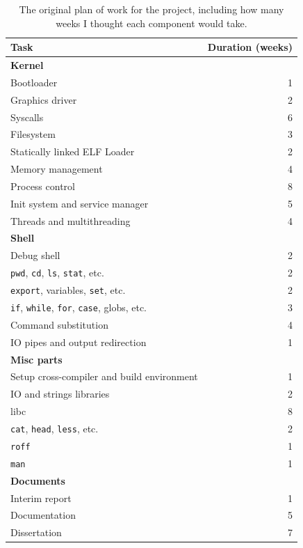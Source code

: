 \documentclass{article}
\begin{document}
\begin{table}[H]
\begin{center}
\begin{tabular}{|l|r|}
    \hline
    Task & Duration (weeks)\\
    \hline \textbf{Kernel} &\\
    Bootloader & 1\\
    Graphics driver & 2\\
    Syscalls & 6\\
    Filesystem & 3\\
    Statically linked ELF Loader & 2\\
    Memory management & 4\\
    Process control & 8\\
    Init system and service manager & 5\\
    Threads and multithreading & 4\\
    \hline \textbf{Shell} &\\
    Debug shell & 2\\
    \texttt{pwd}, \texttt{cd}, \texttt{ls}, \texttt{stat}, etc. & 2\\
    \texttt{export}, variables, \texttt{set}, etc. & 2\\
    \texttt{if}, \texttt{while}, \texttt{for}, \texttt{case}, globs, etc. & 3\\
    Command substitution & 4\\
    IO pipes and output redirection & 1\\
    \hline \textbf{Misc parts} &\\
    Setup cross-compiler and build environment & 1\\
    IO and strings libraries & 2\\
    libc & 8\\
    \texttt{cat}, \texttt{head}, \texttt{less}, etc. & 2\\
    \texttt{roff} & 1\\
    \texttt{man} & 1\\
    \hline \textbf{Documents} &\\
    Interim report & 1\\
    Documentation & 5\\
    Dissertation & 7\\
    \hline
\end{tabular}
\caption{The original plan of work for the project, including how many weeks I
thought each component would take.}
\label{tab:original-work-plan}
\end{center}
\end{table}
\end{document}
